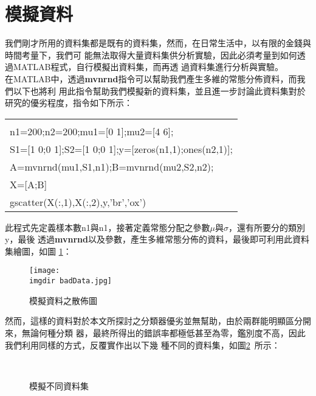 	\section{模擬資料}
		我們剛才所用的資料集都是既有的資料集，然而，在日常生活中，以有限的金錢與時間考量下，我們可			能無法取得大量資料集供分析實驗，因此必須考量到如何透過MATLAB程式，自行模擬出資料集，而再透			過資料集進行分析與實驗。
		\\		
		在MATLAB中，透過\textbf{mvnrnd}指令可以幫助我們產生多維的常態分佈資料，而我們以下也將利			用此指令幫助我們模擬新的資料集，並且進一步討論此資料集對於研究的優劣程度，指令如下所示：
		\begin{center}\colorbox{slight}{
			\begin{tabular}{p{}}
				\MJHmarker{\textbf{\color{darkblue}{MATLAB語法 :}}}\\		
					n1=200;n2=200;mu1=[0 1];mu2=[4 6];\\					
					S1=[1 0;0 1];S2=[1 0;0 1];y=[zeros(n1,1);ones(n2,1)];\\				
					A=mvnrnd(mu1,S1,n1);B=mvnrnd(mu2,S2,n2);\\
					X=[A;B]\\
					gscatter(X(:,1),X(:,2),y,'br','ox')\\

			\end{tabular}
		}
		\end{center}
		此程式先定義樣本數n1與n1，接著定義常態分配之參數$\mu$與$\sigma$，還有所要分的類別y，最後			透過\textbf{mvnrnd}以及參數，產生多維常態分佈的資料，最後即可利用此資料集繪圖，如圖				\ref{fig:badData}：
		\begin{figure}[H]	
		 	\centering	 			 	 
   			\texttt{[image: \\imgdir badData.jpg]} 
   			\caption{模擬資料之散佈圖}   		
   			\label{fig:badData}   			 		 
		\end{figure}
		然而，這樣的資料對於本文所探討之分類器優劣並無幫助，由於兩群能明顯區分開來，無論何種分類				器，最終所得出的錯誤率都極低甚至為零，鑑別度不高，因此我們利用同樣的方式，反覆實作出以下幾			種不同的資料集，如圖\ref{fig:Data}\ 所示：
		\begin{figure}[H]
    		 	\centering
       			 \\
       			 \caption{模擬不同資料集}   
   				 \label{fig:Data}
		\end{figure}
